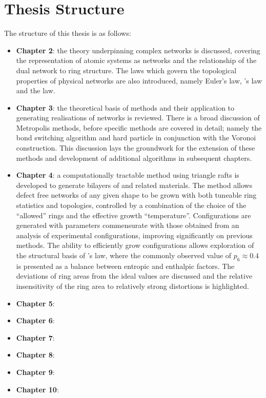 \section{Thesis Structure}

The structure of this thesis is as follows:

\begin{itemize}
	\item \textbf{Chapter 2}: the theory underpinning complex networks is discussed, covering the representation of atomic systems as networks and the relationship of the dual network to ring structure.
The laws which govern the topological properties of physical networks are also introduced, namely Euler's law, \lm's law and the \aw{} law.

	\item \textbf{Chapter 3}: the theoretical basis of \mc{} methods and their application to generating realisations of \td{} networks is reviewed.
There is a broad discussion of Metropolis \mc{} methods, before specific methods are covered in detail; namely the bond switching algorithm and hard particle \mc{} in conjunction with the Voronoi construction.
This discussion lays the groundwork for the extension of these methods and development of additional \mc{} algorithms in subsequent chapters.
	
	\item \textbf{Chapter 4}: a computationally tractable \mc{} method using triangle rafts is developed to generate bilayers of \sioii{} and related materials.
The method allows defect free networks of any given shape to be grown with both tuneable ring statistics and topologies, controlled by a combination of the choice of the ``allowed'' rings and the effective growth ``temperature''. 
Configurations are generated with \aw{} parameters commensurate with those obtained from an analysis of experimental configurations, improving significantly on previous methods.
The ability to efficiently grow configurations allows exploration of the structural basis of \lm’s law, where the commonly observed value of $p_6\approx0.4$ is presented as a balance between entropic and enthalpic factors. 
The deviations of ring areas from the ideal values are discussed and the relative insensitivity of the ring area to relatively strong distortions is highlighted.
	
	\item \textbf{Chapter 5}:
	
	\item \textbf{Chapter 6}:
	
	\item \textbf{Chapter 7}:
	
	\item \textbf{Chapter 8}:

	\item \textbf{Chapter 9}:
	
	\item \textbf{Chapter 10}:
\end{itemize}
	
 
